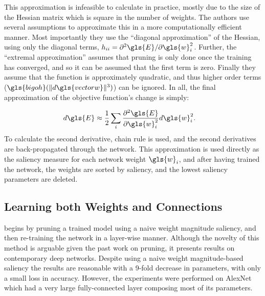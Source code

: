 \documentclass[thesis]{subfiles}
\begin{document}
    This approximation is infeasible to calculate in practice, mostly due to the size of the Hessian matrix which is square in the number of weights. The authors use several assumptions to approximate this in a more computationally efficient manner. Most importantly they use the ``diagonal approximation'' of the Hessian, using only the diagonal terms, $h_{ii}=\partial^2 \gls{E} / \partial \gls{w}_i^2$. Further, the ``extremal approximation'' assumes that pruning is only done once the training has converged, and so it can be assumed that the first term is zero. Finally they assume that the function is approximately quadratic, and thus higher order terms (\ie $\gls{bigoh}(\|d \gls{vectorw}\|^3)$) can be ignored. In all, the final approximation of the objective function's change is simply:

    \begin{align}
       d \gls{E} &\approx \frac{1}{2} \sum_i \frac{\partial^2 \gls{E}}{\partial \gls{w}_i^2} d \gls{w}_i^2.
    \end{align}
    To calculate the second derivative, chain rule is used, and the second derivatives are back-propagated through the network. This approximation is used directly as the saliency measure for each network weight $\gls{w}_i$, and after having trained the network, the weights are sorted by saliency, and the lowest saliency parameters are deleted.
	
    

	\subsection{Learning both Weights and Connections}
	\citet{han2015learning} begins by pruning a trained model using a naive weight magnitude saliency, and then re-training the network in a layer-wise manner. Although the novelty of this method is arguable given the past work on pruning, it presents results on contemporary deep networks. Despite using a naive weight magnitude-based saliency the results are reasonable with a 9-fold decrease in parameters, with only a small loss in accuracy. However, the experiments were performed on AlexNet which had a very large fully-connected layer composing most of its parameters.
\end{document}
